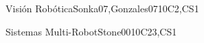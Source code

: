 \begin{syllabus}
\begin{unit}{\ISPerceptionandComputerVision}{Visión Robótica}{Sonka07,Gonzales07}{10}{C2,CS1}
\begin{topics}%
    \item \ISPerceptionandComputerVisionTopicComputer
    \item \ISPerceptionandComputerVisionTopicModularity
\end{topics}
\begin{learningoutcomes}
    \item \ISPerceptionandComputerVisionLOSummarizeTheImage [\Usage]
    \item \ISPerceptionandComputerVisionLOImplementD [\Usage]
\end{learningoutcomes}
\end{unit}

\begin{unit}{\ISRobotics}{Sistemas Multi-Robot}{Stone00}{10}{C23,CS1}
\begin{topics}%
    \item \ISRoboticsTopicMultiple
\end{topics}
\begin{learningoutcomes}
    \item \ISRoboticsLOCompareAndLeast [\Familiarity]
    \item \ISRoboticsLODescribeAt [\Familiarity]
\end{learningoutcomes}
\end{unit}

\begin{coursebibliography}
\end{coursebibliography}

\end{syllabus}
